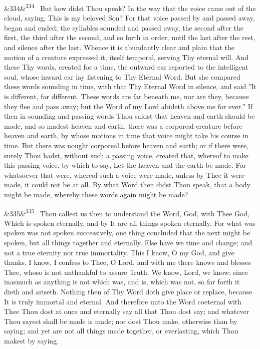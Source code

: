 \documentclass[12pt]{article}
\newcommand{\para}[1][]{\par\noindent\ifx&#1&\else\textsuperscript{\footnotesize #1}~\fi}
\begin{document}
\para[334] But how didst Thou speak? In the way that the voice came out of the cloud, saying, This is my beloved Son? For that voice passed by and passed away, began and ended; the syllables sounded and passed away, the second after the first, the third after the second, and so forth in order, until the last after the rest, and silence after the last. Whence it is abundantly clear and plain that the motion of a creature expressed it, itself temporal, serving Thy eternal will. And these Thy words, created for a time, the outward ear reported to the intelligent soul, whose inward ear lay listening to Thy Eternal Word. But she compared these words sounding in time, with that Thy Eternal Word in silence, and said "It is different, far different. These words are far beneath me, nor are they, because they flee and pass away; but the Word of my Lord abideth above me for ever." If then in sounding and passing words Thou saidst that heaven and earth should be made, and so madest heaven and earth, there was a corporeal creature before heaven and earth, by whose motions in time that voice might take his course in time. But there was nought corporeal before heaven and earth; or if there were, surely Thou hadst, without such a passing voice, created that, whereof to make this passing voice, by which to say, Let the heaven and the earth be made. For whatsoever that were, whereof such a voice were made, unless by Thee it were made, it could not be at all. By what Word then didst Thou speak, that a body might be made, whereby these words again might be made?

\para[335] Thou callest us then to understand the Word, God, with Thee God, Which is spoken eternally, and by It are all things spoken eternally. For what was spoken was not spoken successively, one thing concluded that the next might be spoken, but all things together and eternally. Else have we time and change; and not a true eternity nor true immortality. This I know, O my God, and give thanks. I know, I confess to Thee, O Lord, and with me there knows and blesses Thee, whoso is not unthankful to assure Truth. We know, Lord, we know; since inasmuch as anything is not which was, and is, which was not, so far forth it dieth and ariseth. Nothing then of Thy Word doth give place or replace, because It is truly immortal and eternal. And therefore unto the Word coeternal with Thee Thou dost at once and eternally say all that Thou dost say; and whatever Thou sayest shall be made is made; nor dost Thou make, otherwise than by saying; and yet are not all things made together, or everlasting, which Thou makest by saying.
\end{document}

